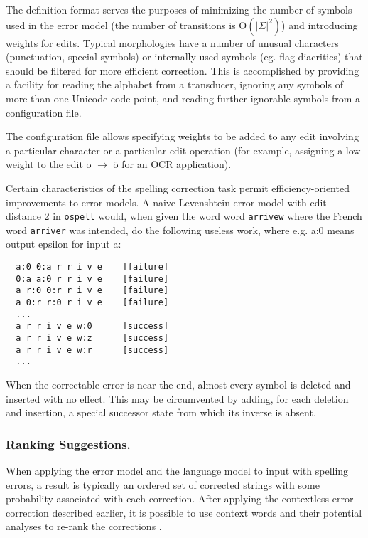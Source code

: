 \documentclass{llncs}
\begin{document}
The definition format serves the purposes of minimizing the number of symbols
used in the error model (the number of transitions is $\mathrm{O}(|\Sigma|^2)$)
and introducing weights for edits. Typical
morphologies have a number of unusual characters (punctuation, special symbols)
or internally used symbols (eg. flag diacritics) that should be filtered for
more efficient correction. This is accomplished by providing a facility for
reading the alphabet from a transducer, ignoring any symbols of more than
one Unicode code point, and reading further ignorable symbols from a
configuration file.

The configuration file allows specifying weights to be added to any edit
involving a particular character or a particular edit operation (for example,
assigning a low weight to the edit o $\rightarrow$ ö for an OCR application).

Certain characteristics of the spelling correction task permit
efficiency-oriented improvements to error models. A naive Levenshtein error
model with edit distance 2 in \verb!ospell! would, when given the word
word \verb!arrivew! where the French word \verb!arriver! was intended,
do the following useless work, where e.g. a:0 means output epsilon for input a:

{\footnotesize
\begin{verbatim}
  a:0 0:a r r i v e    [failure]
  0:a a:0 r r i v e    [failure]
  a r:0 0:r r i v e    [failure]
  a 0:r r:0 r i v e    [failure]
  ...
  a r r i v e w:0      [success]
  a r r i v e w:z      [success]
  a r r i v e w:r      [success]
  ...
\end{verbatim}
}

When the correctable error is near the end, almost every symbol is deleted and
inserted with no effect. This may be circumvented by adding, for each deletion
and insertion, a special successor state from which its inverse is absent.

\subsubsection{Ranking Suggestions.}

When applying the error model and the language model to input with spelling errors,
a result is typically an ordered set of corrected strings with some probability
associated with each correction. After applying the contextless error correction
described earlier, it is possible to use context words and their potential
analyses to re-rank the corrections \cite{pirinen/2012/cicling}.
\end{document}
